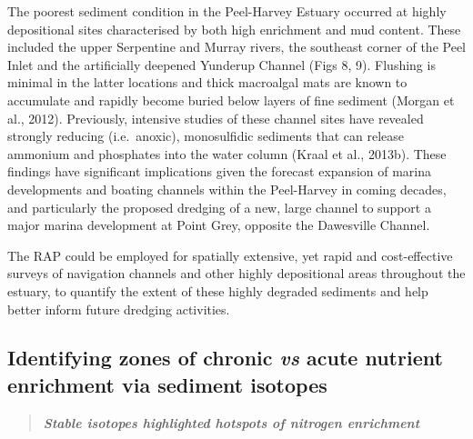 \documentclass[
]{book}
\begin{document}
The poorest sediment condition in the Peel-Harvey Estuary occurred at highly depositional sites characterised by both high enrichment and mud content. These included the upper Serpentine and Murray rivers, the southeast corner of the Peel Inlet and the artificially deepened Yunderup Channel (Figs 8, 9). Flushing is minimal in the latter locations and thick macroalgal mats are known to accumulate and rapidly become buried below layers of fine sediment (Morgan et al., 2012). Previously, intensive studies of these channel sites have revealed strongly reducing (i.e.~anoxic), monosulfidic sediments that can release ammonium and phosphates into the water column (Kraal et al., 2013b). These findings have significant implications given the forecast expansion of marina developments and boating channels within the Peel-Harvey in coming decades, and particularly the proposed dredging of a new, large channel to support a major marina development at Point Grey, opposite the Dawesville Channel.

The RAP could be employed for spatially extensive, yet rapid and cost-effective surveys of navigation channels and other highly depositional areas throughout the estuary, to quantify the extent of these highly degraded sediments and help better inform future dredging activities.

\hypertarget{identifying-zones-of-chronic-vs-acute-nutrient-enrichment-via-sediment-isotopes}{%
\subsection{\texorpdfstring{Identifying zones of chronic \emph{vs} acute nutrient enrichment via sediment isotopes}{Identifying zones of chronic vs acute nutrient enrichment via sediment isotopes}}\label{identifying-zones-of-chronic-vs-acute-nutrient-enrichment-via-sediment-isotopes}}

\begin{quote}
\textbf{\emph{Stable isotopes highlighted hotspots of nitrogen enrichment}}
\end{quote}
\end{document}
